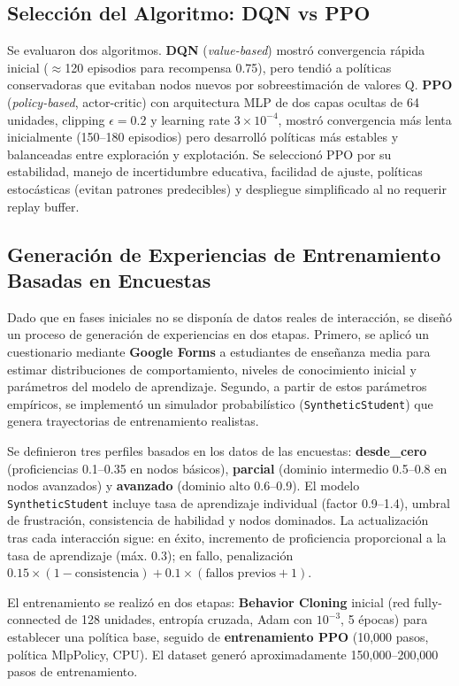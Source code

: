 \subsection{Selección del Algoritmo: DQN vs PPO}

Se evaluaron dos algoritmos. \textbf{DQN} (\textit{value-based}) mostró convergencia rápida inicial ($\approx$120 episodios para recompensa 0.75), pero tendió a políticas conservadoras que evitaban nodos nuevos por sobreestimación de valores Q. \textbf{PPO} (\textit{policy-based}, actor-critic) con arquitectura MLP de dos capas ocultas de 64 unidades, clipping $\epsilon=0.2$ y learning rate $3\times10^{-4}$, mostró convergencia más lenta inicialmente (150--180 episodios) pero desarrolló políticas más estables y balanceadas entre exploración y explotación. Se seleccionó PPO por su estabilidad, manejo de incertidumbre educativa, facilidad de ajuste, políticas estocásticas (evitan patrones predecibles) y despliegue simplificado al no requerir replay buffer.

\subsection{Generación de Experiencias de Entrenamiento Basadas en Encuestas}

Dado que en fases iniciales no se disponía de datos reales de interacción, se diseñó un proceso de generación de experiencias en dos etapas. Primero, se aplicó un cuestionario mediante \textbf{Google Forms} a estudiantes de enseñanza media para estimar distribuciones de comportamiento, niveles de conocimiento inicial y parámetros del modelo de aprendizaje. Segundo, a partir de estos parámetros empíricos, se implementó un simulador probabilístico (\texttt{SyntheticStudent}) que genera trayectorias de entrenamiento realistas.

Se definieron tres perfiles basados en los datos de las encuestas: \textbf{desde\_cero} (proficiencias 0.1--0.35 en nodos básicos), \textbf{parcial} (dominio intermedio 0.5--0.8 en nodos avanzados) y \textbf{avanzado} (dominio alto 0.6--0.9). El modelo \texttt{SyntheticStudent} incluye tasa de aprendizaje individual (factor 0.9--1.4), umbral de frustración, consistencia de habilidad y nodos dominados. La actualización tras cada interacción sigue: en éxito, incremento de proficiencia proporcional a la tasa de aprendizaje (máx. 0.3); en fallo, penalización $0.15 \times (1 - \text{consistencia}) + 0.1 \times (\text{fallos previos} + 1)$.

El entrenamiento se realizó en dos etapas: \textbf{Behavior Cloning} inicial (red fully-connected de 128 unidades, entropía cruzada, Adam con $10^{-3}$, 5 épocas) para establecer una política base, seguido de \textbf{entrenamiento PPO} (10,000 pasos, política MlpPolicy, CPU). El dataset generó aproximadamente 150,000--200,000 pasos de entrenamiento.

